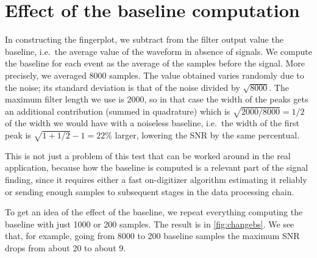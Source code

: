 \section{Effect of the baseline computation}

In constructing the fingerplot, we subtract from the filter output value the
baseline, i.e.\ the average value of the waveform in absence of signals. We
compute the baseline for each event as the average of the samples before the
signal. More precisely, we averaged \num{8000} samples. The value obtained
varies randomly due to the noise; its standard deviation is that of the noise
divided by $\sqrt{8000}$. The maximum filter length we use is 2000, so in that
case the width of the peaks gets an additional contribution (summed in
quadrature) which is $\sqrt{2000/8000} = 1/2$ of the width we would have with a
noiseless baseline, i.e.\ the width of the first peak is $\sqrt{1 + 1/2} - 1 =
\SI{22}\%$ larger, lowering the SNR by the same percentual.

This is not just a problem of this test that can be worked around in the real
application, because how the baseline is computed is a relevant part of the
signal finding, since it requires either a fast on-digitizer algorithm
estimating it reliably or sending enough samples to subsequent stages in the
data processing chain.

To get an idea of the effect of the baseline, we repeat everything computing
the baseline with just 1000 or 200 samples. The result is in
\autoref{fig:changebs}. We see that, for example, going from 8000 to 200
baseline samples the maximum SNR drops from about 20 to about 9.



\begin{figure}
    

\end{figure}

